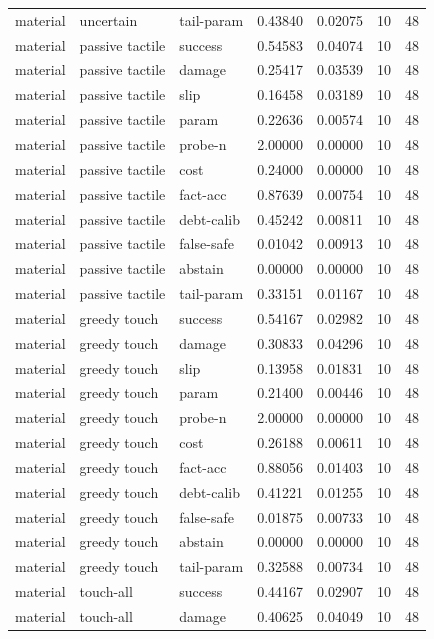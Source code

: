 \documentclass{article}
\begin{document}
\begin{center}
\begin{longtable}{lllllll}
material & uncertain & tail-param & 0.43840 & 0.02075 & 10 & 48 \\
material & passive tactile & success & 0.54583 & 0.04074 & 10 & 48 \\
material & passive tactile & damage & 0.25417 & 0.03539 & 10 & 48 \\
material & passive tactile & slip & 0.16458 & 0.03189 & 10 & 48 \\
material & passive tactile & param & 0.22636 & 0.00574 & 10 & 48 \\
material & passive tactile & probe-n & 2.00000 & 0.00000 & 10 & 48 \\
material & passive tactile & cost & 0.24000 & 0.00000 & 10 & 48 \\
material & passive tactile & fact-acc & 0.87639 & 0.00754 & 10 & 48 \\
material & passive tactile & debt-calib & 0.45242 & 0.00811 & 10 & 48 \\
material & passive tactile & false-safe & 0.01042 & 0.00913 & 10 & 48 \\
material & passive tactile & abstain & 0.00000 & 0.00000 & 10 & 48 \\
material & passive tactile & tail-param & 0.33151 & 0.01167 & 10 & 48 \\
material & greedy touch & success & 0.54167 & 0.02982 & 10 & 48 \\
material & greedy touch & damage & 0.30833 & 0.04296 & 10 & 48 \\
material & greedy touch & slip & 0.13958 & 0.01831 & 10 & 48 \\
material & greedy touch & param & 0.21400 & 0.00446 & 10 & 48 \\
material & greedy touch & probe-n & 2.00000 & 0.00000 & 10 & 48 \\
material & greedy touch & cost & 0.26188 & 0.00611 & 10 & 48 \\
material & greedy touch & fact-acc & 0.88056 & 0.01403 & 10 & 48 \\
material & greedy touch & debt-calib & 0.41221 & 0.01255 & 10 & 48 \\
material & greedy touch & false-safe & 0.01875 & 0.00733 & 10 & 48 \\
material & greedy touch & abstain & 0.00000 & 0.00000 & 10 & 48 \\
material & greedy touch & tail-param & 0.32588 & 0.00734 & 10 & 48 \\
material & touch-all & success & 0.44167 & 0.02907 & 10 & 48 \\
material & touch-all & damage & 0.40625 & 0.04049 & 10 & 48 \\
\bottomrule
\end{longtable}
\renewcommand{\arraystretch}{1.0}
\end{center}
\end{document}
